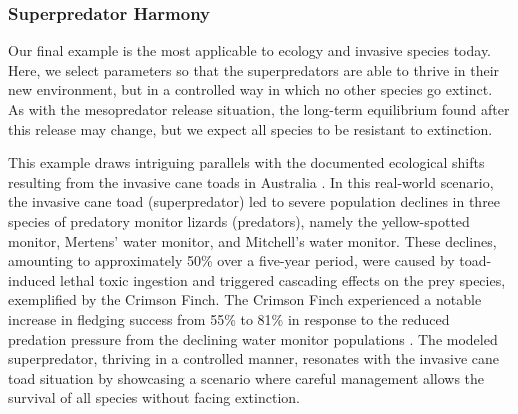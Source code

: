 \documentclass[journal]{IEEEtran}
\begin{document}
\newpage

\subsubsection{Superpredator Harmony}
Our final example is the most applicable to ecology and invasive species today. Here, we select parameters so that the superpredators are able to thrive in their new environment, but in a controlled way in which no other species go extinct. As with the mesopredator release situation, the long-term equilibrium found after this release may change, but we expect all species to be resistant to extinction.\par
This example draws intriguing parallels with the documented ecological shifts resulting from the invasive cane toads in Australia \cite{Invasive_toads}. In this real-world scenario, the invasive cane toad (superpredator) led to severe population declines in three species of predatory monitor lizards (predators), namely the yellow-spotted monitor, Mertens’ water monitor, and Mitchell’s water monitor. These declines, amounting to approximately 50\% over a five-year period, were caused by toad-induced lethal toxic ingestion and triggered cascading effects on the prey species, exemplified by the Crimson Finch. The Crimson Finch experienced a notable increase in fledging success from 55\% to 81\% in response to the reduced predation pressure from the declining water monitor populations \cite{Invasive_toads}. The modeled superpredator, thriving in a controlled manner, resonates with the invasive cane toad situation by showcasing a scenario where careful management allows the survival of all species without facing extinction.\par

\end{document}
